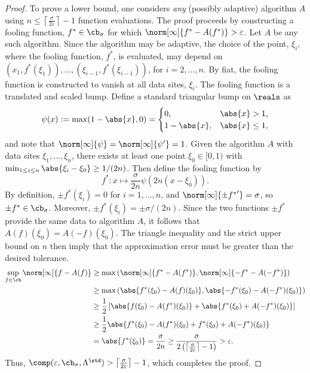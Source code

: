 \documentclass[12pt]{amsart}
\begin{document}
\begin{proof}
To prove a lower bound, one considers \emph{any} (possibly adaptive) algorithm $A$ using $n\le \left \lceil \frac{\sigma}{2\varepsilon} \right \rceil - 1$ function evaluations.  The proof proceeds by constructing a fooling function, $f^* \in \cb_\sigma$ for which $\norm[\infty]{f^* - A(f^*)} > \varepsilon$.  Let $A$ be any such algorithm.  Since the algorithm may be adaptive, the choice of the point, $\xi_i$, where the fooling function, $f^*$, is evaluated, may depend on $(x_1,f^*(\xi_1)), \ldots, (\xi_{i-1},f^*(\xi_{i-1}))$, for $i=2, \ldots, n$. By fiat, the fooling function is constructed to vanish at all data sites, $\xi_i$.  The fooling function is a translated and scaled bump.  Define a standard triangular bump on $\reals$ as 
\begin{equation} \label{trianglebump}
\psi(x) : = \max(1-\abs{x},0) = \begin{cases}0, & \abs{x} > 1, \\
1-\abs{x}, & \abs{x} \le 1,
\end{cases}
\end{equation}
and note that $\norm[\infty]{\psi} = \norm[\infty]{\psi'}=1$.  Given the algorithm $A$ with data sites $\xi_1, \ldots, \xi_n$, there exists at least one point $\xi_0 \in [0,1)$ with $\min_{1 \le i \le n} \abs{\xi_i -\xi_0} \ge 1/(2n)$.  Then define the fooling function by 
\[
f^*: x \mapsto \frac{\sigma}{2n}\psi(2n(x-\xi_0)).
\]
By definition, $\pm f^*(\xi_i)=0$ for $i=1, \ldots, n$, and $\norm[\infty]{\pm{f^*}'} = \sigma$, so $\pm f^* \in \cb_\sigma$.   Moreover, $\pm f^*(\xi_i)= \pm \sigma/(2n)$.  Since the two functions $\pm f^*$ provide the same data to algorithm $A$, it follows that $A(f)(\xi_0)=A(-f)(\xi_0)$.  The triangle inequality and the strict upper bound on $n$ then imply that the approximation error must be greater than the desired tolerance.
\begin{align*}
\sup_{f \in \cb} \norm[\infty]{f - A(f)} 
&\ge \max\left(\norm[\infty]{f^* - A(f^*)},\norm[\infty]{-f^* - A(- f^*)}\right) \\ 
& \ge \max\left(\abs{f^*(\xi_0) - A(f)(\xi_0)},\abs{-f^*(\xi_0) - A(-f^*)(\xi_0)}\right) \\
& \ge \frac{1}{2} \left [ \abs{f(\xi_0) - A(f^*)(\xi_0)} + \abs{f^*(\xi_0)+ A(-f^*)(\xi_0)} \right ]\\
& \ge \frac{1}{2} \abs{f^*(\xi_0) - A(f^*)(\xi_0) + f^*(\xi_0) + A(-f^*)(\xi_0)}\\
& = \abs{f^*(\xi_0)} = \frac{\sigma}{2n} \ge \frac{\sigma}{2 \left(\left \lceil \frac{\sigma}{2\varepsilon} \right \rceil - 1\right)} > \varepsilon. 
\end{align*}
Thus, $\comp(\varepsilon,\cb_{\sigma},\Lambda^{\std}) > \left \lceil \frac{\sigma}{2\varepsilon} \right \rceil -1$, which completes the proof.
\end{proof}
\end{document}
